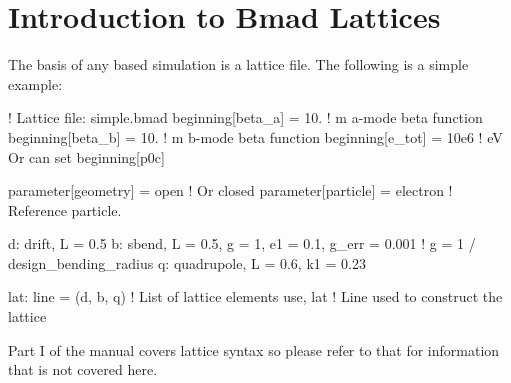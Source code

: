 \documentclass{hitec}
\newcommand{\Section}[1]{\section{#1}\vspace*{-1ex}}
\begin{document}
\Section{Introduction to Bmad Lattices}
\label{s:bmad.intro}

The basis of any \bmad based simulation is a lattice file. The following is a
simple example:
\begin{code}
! Lattice file: simple.bmad
beginning[beta_a] = 10.   ! m  a-mode beta function
beginning[beta_b] = 10.   ! m  b-mode beta function
beginning[e_tot] = 10e6   ! eV   Or can set beginning[p0c]

parameter[geometry] = open          ! Or closed
parameter[particle] = electron      ! Reference particle.

d: drift, L = 0.5
b: sbend, L = 0.5, g = 1, e1 = 0.1, g_err = 0.001   ! g = 1 / design_bending_radius
q: quadrupole, L = 0.6, k1 = 0.23

lat: line = (d, b, q)       ! List of lattice elements
use, lat                    ! Line used to construct the lattice
\end{code}
Part I of the \bmad manual covers lattice syntax so please refer to that for information that
is not covered here.
\end{document}
